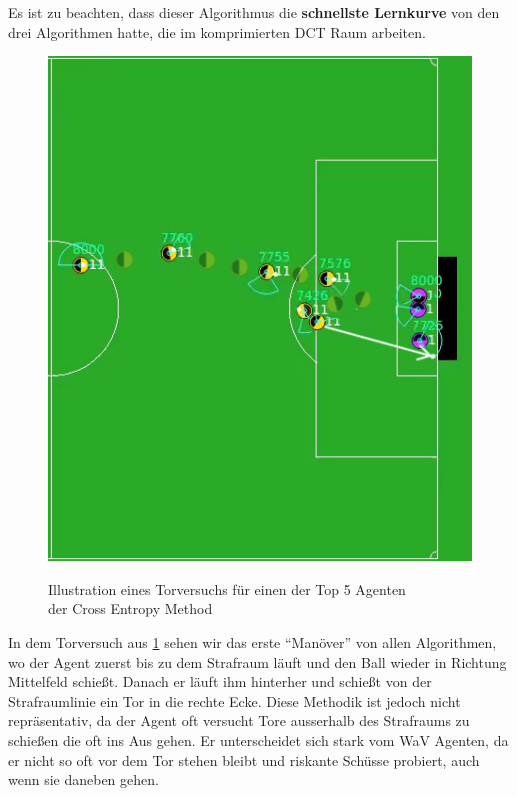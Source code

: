                 \noindent
                Es ist zu beachten, dass dieser Algorithmus die \textbf{schnellste Lernkurve} von den drei Algorithmen hatte, die im komprimierten DCT Raum arbeiten.
\newpage
                \begin{figure}[H]
                    \begin{center}
                        \includegraphics[scale=0.83]{../pictures/games/cross-entropy-gameplay.png}\\
                        \caption{Illustration eines Torversuchs für einen der Top 5 Agenten\\ der Cross Entropy Method \label{fig:ce-gameplay}}
                    \end{center}
                \end{figure}

                \noindent
                In dem Torversuch aus \ref{fig:ce-gameplay} sehen wir das erste ``Manöver'' von allen Algorithmen, wo der Agent zuerst bis zu dem Strafraum läuft und den Ball wieder in Richtung Mittelfeld schießt. Danach er läuft ihm hinterher und schießt von der Strafraumlinie ein Tor in die rechte Ecke. Diese Methodik ist jedoch nicht repräsentativ, da der Agent oft versucht Tore ausserhalb des Strafraums zu schießen die oft ins Aus gehen. Er unterscheidet sich stark vom WaV Agenten, da er nicht so oft vor dem Tor stehen bleibt und riskante Schüsse probiert, auch wenn sie daneben gehen.
\newpage
